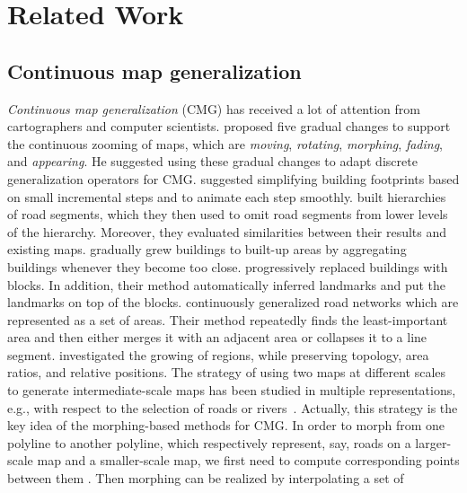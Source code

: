 \documentclass[acmsmall,natbib=false]{acmart}
\begin{document}
\section{Related Work}
\label{sec:AreaAgg_RelatedWork}

\subsection{Continuous map generalization}

\emph{Continuous map generalization} (CMG)
has received a lot of attention
from cartographers and computer scientists.
\Textcite{vanKreveld2001} proposed five gradual changes
to support the continuous zooming of maps, 
which are \emph{moving}, \emph{rotating}, \emph{morphing}, 
\emph{fading}, and \emph{appearing}. 
He suggested using these gradual changes 
to adapt discrete generalization operators for CMG.
\textcite{Sester2005_CG} suggested simplifying building
footprints based on small incremental steps and 
to animate each step smoothly.
\textcite{Li2012Continuous} built hierarchies of road segments,
which they then used to omit road segments 
from lower levels of the hierarchy.
Moreover, they evaluated similarities 
between their results and existing maps.
\textcite{Peng2017Building} gradually grew
buildings to built-up areas by aggregating buildings 
whenever they become too close.
\textcite{Touya2017Progressive} progressively replaced
buildings with blocks. 
In addition, their method automatically inferred landmarks 
and put the landmarks on top of the blocks.
\textcite{Suba2016Road} continuously generalized road networks
which are represented as a set of areas.
Their method repeatedly finds the least-important area 
and then either merges it with an adjacent area 
or collapses it to a line segment.
\textcite{Danciger2009} investigated the growing of regions, 
while preserving topology, area ratios, and
relative positions.
The strategy of using two maps at different scales
to generate intermediate-scale maps has been studied in multiple
representations, e.g., with respect to the selection of roads or
rivers~\parencite{Peng2012River,Girres2014}. 
Actually, this strategy is the key idea of the
morphing-based methods for CMG.
In order to morph from one polyline to another polyline,
which respectively represent, say, roads on a larger-scale map 
and a smaller-scale map, we first need to compute 
corresponding points between them 
\parencite[e.g.,][]{Cecconi2003,Noellenburg2008,Chazal2010BallMap,
Deng2015,Li2017_Building,Li2017Annealing}.
Then morphing can be realized by interpolating a set of 
\end{document}

